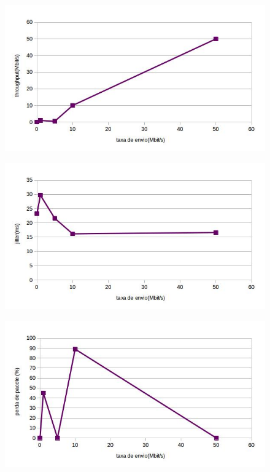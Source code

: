 \documentclass[12pt]{article}
\begin{document}
\newpage{} 
\begin{figure}[ht]
\centering
\includegraphics[scale=0.5]{terceirothru.jpg}
\caption{}
\label{3thr}
\end{figure}
\begin{figure}[ht]
\centering
\includegraphics[scale=0.5]{terceirojitt.jpg}
\caption{}
\label{3ji}
\end{figure}
\begin{figure}[ht]
\centering
\includegraphics[scale=0.5]{terceiroperda.jpg}
\caption{}
\label{3perda}
\end{figure}
\newpage{} 
\end{document}
